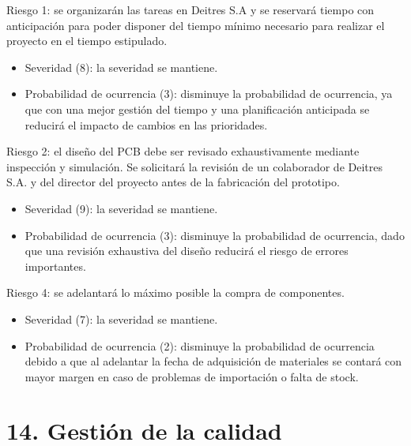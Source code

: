 \documentclass[
11pt, %
]{charter}
\begin{document}
Riesgo 1: se organizarán las tareas en Deitres S.A y se reservará tiempo con anticipación para poder disponer del tiempo mínimo necesario para realizar el proyecto en el tiempo estipulado.
  \begin{itemize}
	\item Severidad (8): la severidad se mantiene.
	\item Probabilidad de ocurrencia (3): disminuye la probabilidad de ocurrencia, ya que con una mejor gestión del tiempo y una planificación anticipada se reducirá el impacto de cambios en las prioridades.
	\end{itemize}
\pagebreak
Riesgo 2:  el diseño del PCB debe ser revisado exhaustivamente mediante inspección y simulación. Se solicitará la revisión de un colaborador de Deitres S.A. y del director del proyecto antes de la fabricación del prototipo.
  \begin{itemize}
	\item Severidad (9): la severidad se mantiene.
	\item Probabilidad de ocurrencia (3):  disminuye la probabilidad de ocurrencia, dado que una revisión exhaustiva del diseño reducirá el riesgo de errores importantes.
	\end{itemize}
Riesgo 4: se adelantará lo máximo posible la compra de componentes.
  \begin{itemize}
	\item Severidad (7): la severidad se mantiene.
	\item Probabilidad de ocurrencia (2):  disminuye la probabilidad de ocurrencia debido a que al adelantar la fecha de adquisición de materiales se contará con mayor margen en caso de problemas de importación o falta de stock.
	\end{itemize}

\section{14. Gestión de la calidad}
\label{sec:calidad}
\end{document}
